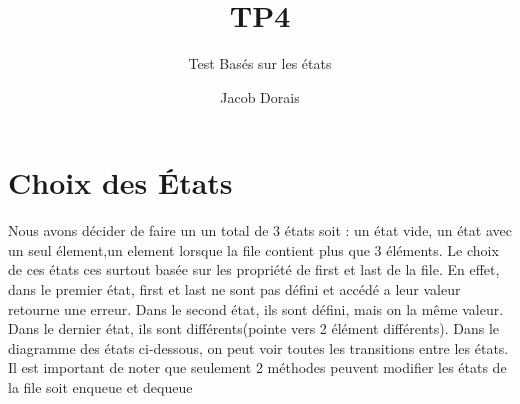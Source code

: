 \documentclass[11pt]{article}
\title{TP4}
\subtitle{Test Basés sur les états}
\author{Jacob Dorais}{Billy Bouchard}{Gr 02}
\begin{document}
\maketitle
\section{Choix des États}
Nous avons décider de faire un un total de 3 états soit : un état vide, un état avec un seul élement,un element lorsque la file contient plus que 3 éléments.
Le choix de ces états ces surtout basée sur les propriété de first et last de la file.
En effet, dans le premier état, first et last ne sont pas défini et accédé a leur valeur retourne une erreur.
Dans le second état, ils sont défini, mais on la même valeur.
Dans le dernier état, ils sont différents(pointe vers 2 élément différents).
Dans le diagramme des états ci-dessous, on peut voir toutes les transitions entre les états.
Il est important de noter que seulement 2 méthodes peuvent modifier les états de la file soit enqueue et dequeue
\end{document}
